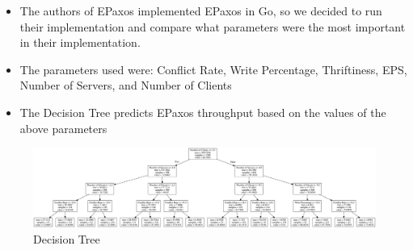 
\begin{itemize}
  \item The authors of EPaxos implemented EPaxos in Go, so we decided to run their implementation and compare
    what parameters were the most important in their implementation.
  \item The parameters used were: Conflict Rate, Write Percentage, Thriftiness, EPS, Number of Servers, and
    Number of Clients
  \item The Decision Tree predicts EPaxos throughput based on the values of the above parameters

\end{itemize}

\begin{figure}
    \includegraphics[width=\linewidth]{figures/epaxos_decision_tree.png}
    \caption{Decision Tree}
    \label{fig:tree}
  \end{figure}

